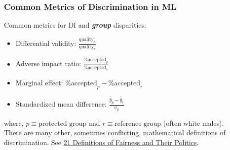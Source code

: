 \documentclass[11pt,aspectratio=169,hyperref={colorlinks}]{beamer}
\begin{document}
		\begin{frame}				
		
			\frametitle{Common Metrics of Discrimination in ML}
			
			Common metrics for DI and \textbf{\textit{group}} disparities:\\
			\begin{itemize}
				\item Differential validity: $\frac{\text{quality}_p}{\text{quality}_r}$
				\item Adverse impact ratio: $\frac{\text{\% accepted}_p }{ \text{\% accepted}_r}$ 
				\item Marginal effect: $\text{\% accepted}_p - \text{\% accepted}_r$
				\item Standardized mean difference: $\frac{\bar{\hat{y}}_p - \bar{\hat{y}}_r}{\sigma_{\hat{y}}}$
			\end{itemize}
			\noindent 
			\scriptsize{where, $p \equiv \text{protected group}$ and $r \equiv \text{reference group}$ (often white males).}\\
			\vspace{5pt}
			\normalsize{There are many other, sometimes conflicting, mathematical definitions of discrimination. 
				See \href{https://www.youtube.com/watch?v=wqamrPkF5kk}{21 Definitions of Fairness and Their Politics}.}
			
		\end{frame}
	
\end{document}
